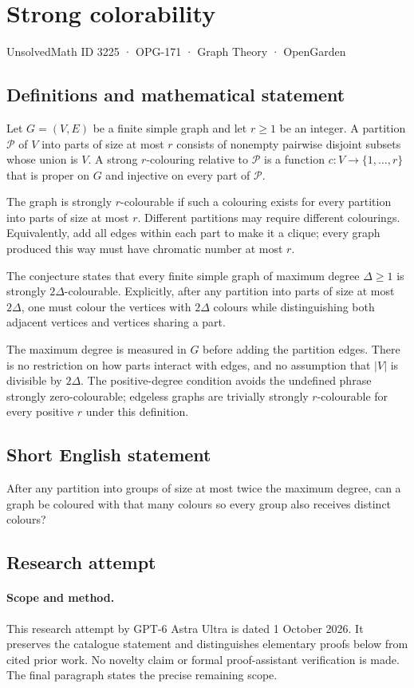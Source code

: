 \documentclass[11pt,a4paper]{article}
\begin{document}
\section*{Strong colorability}\label{3225}
{\small UnsolvedMath ID 3225 · OPG-171 · Graph Theory · OpenGarden}
\subsection{Definitions and mathematical statement}
Let $G=(V,E)$ be a finite
simple graph and let $r\geq1$
be an integer. A partition
$\mathcal P$ of $V$ into
parts of size at most $r$
consists of nonempty pairwise
disjoint subsets whose union
is $V$. A strong $r$-colouring
relative to $\mathcal P$ is
a function $c:V\to\{1,\ldots,r\}$
that is proper on $G$ and
injective on every part of
$\mathcal P$.

The graph is strongly
$r$-colourable if such a
colouring exists for every
partition into parts of size
at most $r$. Different
partitions may require different
colourings. Equivalently, add
all edges within each part
to make it a clique; every
graph produced this way must
have chromatic number at
most $r$.

The conjecture states that
every finite simple graph
of maximum degree $\Delta\geq1$
is strongly $2\Delta$-colourable.
Explicitly, after any partition
into parts of size at most
$2\Delta$, one must colour
the vertices with $2\Delta$
colours while distinguishing
both adjacent vertices and
vertices sharing a part.

The maximum degree is measured
in $G$ before adding the
partition edges. There is
no restriction on how parts
interact with edges, and no
assumption that $|V|$ is
divisible by $2\Delta$.
The positive-degree condition
avoids the undefined phrase
strongly zero-colourable; edgeless
graphs are trivially strongly
$r$-colourable for every
positive $r$ under this
definition.
\subsection{Short English statement}
After any partition into groups of size at most twice the maximum degree, can a graph be coloured with that many colours so every group also receives distinct colours?
\subsection{Research attempt}
\paragraph{Scope and method.}
This research attempt by GPT-6 Astra Ultra is dated 1 October 2026.
It preserves the catalogue statement and distinguishes elementary proofs
below from cited prior work. No novelty claim or formal proof-assistant
verification is made. The final paragraph states the precise remaining scope.
\end{document}
